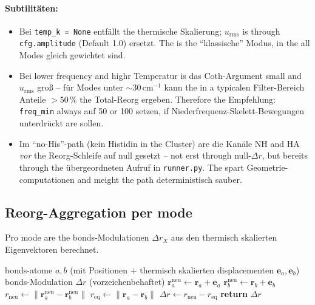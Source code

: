 \documentclass[11pt,a4paper,twoside]{article}
\theoremstyle{remark}
\begin{document}
\paragraph{Subtilit\"aten:}
\begin{itemize}\setlength{\itemsep}{0pt}
  \item Bei \texttt{temp\_k = None} entf\"allt the thermische Skalierung;
        $u_\text{rms}$ is through \texttt{cfg.amplitude} (Default 1.0)
        ersetzt. The is the "`klassische"' Modus, in the all Modes
        gleich gewichtet sind.
  \item Bei lower frequency and highr Temperatur is das
        Coth-Argument small and $u_\text{rms}$ gro{\ss} -- f\"ur Modes
        unter $\sim 30\,$cm$^{-1}$ kann the in a typicalen
        Filter-Bereich Anteile $> 50\,\%$ the Total-Reorg ergeben.
        Therefore the Empfehlung: \texttt{freq\_min} always auf 50 or 100
        setzen, if Niederfrequenz-Skelett-Bewegungen unterdr\"uckt
        are sollen.
  \item Im "`no-His"'-path (kein Histidin in the Cluster) are die
        Kan\"ale NH and HA \emph{vor} the Reorg-Schleife auf null
        gesetzt -- not erst through null-$\Delta r$, but bereits
        through the \"ubergeordneten Aufruf in \texttt{runner.py}.
        The spart Geometrie-computationen and meight the path
        deterministisch sauber.
\end{itemize}

\subsection{Reorg-Aggregation per mode}
\label{app:pseudo-reorg}

Pro mode are the bonds-Modulationen $\Delta r_X$ aus den
thermisch skalierten Eigenvektoren berechnet.

\begin{algorithm}[H]
\caption{\textsc{ComputeBondModulation} (FeFe-example)}
\begin{algorithmic}[1]
\Require bonds-atome $a, b$ (mit Positionen + thermisch skalierten
         displacementen $\mathbf{e}_a, \mathbf{e}_b$)
\Ensure bonds-Modulation $\Delta r$ (vorzeichenbehaftet)
\State $\mathbf{r}_a^\text{neu} \gets \mathbf{r}_a + \mathbf{e}_a$
\State $\mathbf{r}_b^\text{neu} \gets \mathbf{r}_b + \mathbf{e}_b$
\State $r_\text{neu} \gets \|\mathbf{r}_a^\text{neu} - \mathbf{r}_b^\text{neu}\|$
\State $r_\text{eq} \gets \|\mathbf{r}_a - \mathbf{r}_b\|$
\State $\Delta r \gets r_\text{neu} - r_\text{eq}$
\State \textbf{return} $\Delta r$
\end{algorithmic}
\end{algorithm}
\end{document}
